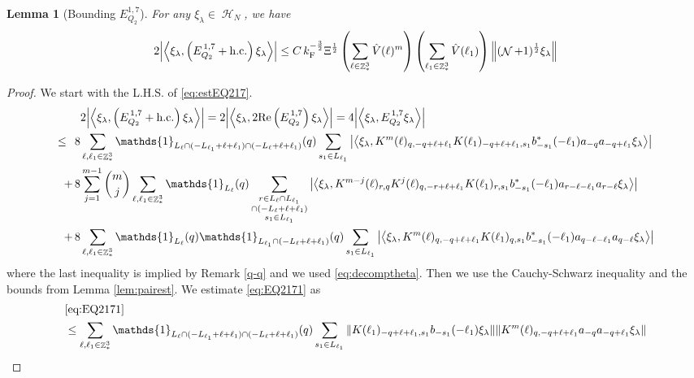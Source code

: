 \documentclass[12pt,a4paper]{article}
\numberwithin{equation}{section}
\newcommand{\1}{\mathbb{I}}
\newcommand{\F}{\mathrm{F}}
\DeclareMathOperator{\Z}{\mathbb{Z}}
\DeclareMathOperator{\HH}{\mathcal{H}}
\DeclareMathOperator{\NN}{\mathcal{N}}
\newcommand{\half}{\frac{1}{2}}
\newcommand{\eva}[1]{\left\langle #1 \right\rangle}
\theoremstyle{plain}
\newtheorem{lemma}[theorem]{Lemma}
\theoremstyle{definition}
\theoremstyle{remark}
\theoremstyle{plain}
\theoremstyle{definition}
\theoremstyle{remark}
\begin{document}
\begin{lemma}[Bounding $E_{Q_2}^{1,7}$]\label{lem:EQ217}
	For any $\xi_\lambda \in \HH_N$, we have
	\begin{align}
		2\abs{\eva{\xi_\lambda,\left(E^{\,1,7}_{Q_2}+\mathrm{h.c.}\right) \xi_\lambda }}
		\leq C\, k_{\F}^{-\frac{3}{2}} \Xi^{\half} \left(\sum\limits_{\ell\in \Z^3_*} \hat{V}(\ell)^m \right) \left(\sum\limits_{\ell_1\in \Z^3_*} \hat{V}(\ell_1) \right) \norm{(\NN+1)^\half \xi_\lambda } \label{eq:estEQ217}
	\end{align}
\end{lemma}
\begin{proof}
 We start with the L.H.S. of \eqref{eq:estEQ217}.
\begin{align}
	&2\abs{\eva{\xi_\lambda,\left(E^{\,1,7}_{Q_2}+\mathrm{h.c.}\right) \xi_\lambda }} =2 \abs{\eva{\xi_\lambda,2\mathrm{Re}\left(E^{\,1,7}_{Q_2}\right) \xi_\lambda }} = 4\abs{\eva{\xi_\lambda, E^{\,1,7}_{Q_2} \xi_\lambda }}\nonumber\\
	\leq\,\;8& \sum\limits_{\ell, \ell_1\in \Z^3_*} \mathds{1}_{L_{\ell} \cap (-L_{\ell_1}+\ell+\ell_1) \cap (-L_{\ell}+\ell+\ell_1)}(q) \sum\limits_{s_1 \in L_{\ell_1}} \abs{\eva{\xi_\lambda, K^m(\ell)_{q,-q+\ell+\ell_1} K(\ell_1)_{-q+\ell+\ell_1,s_1} b^*_{-s_1}(-\ell_1) a_{-q} a_{-q+\ell_1} \xi_\lambda}} \label{eq:EQ2171}\\
	+\,8& \sum\limits_{j=1}^{m-1} {{m}\choose j} \sum\limits_{\ell, \ell_1\in \Z^3_*}\mathds{1}_{L_{\ell}}(q) \sum\limits_{\substack{r\in L_{\ell} \cap L_{\ell_1} \\ \cap (-L_{\ell}+\ell+\ell_1)\\s_1\in L_{\ell_1}}}  \abs{\eva{\xi_\lambda, K^{m-j}(\ell)_{r,q} K^j(\ell)_{q,-r+\ell+\ell_1} K(\ell_1)_{r,s_1} b^*_{-s_1}(-\ell_1)a_{r-\ell-\ell_1}a_{r-\ell} \xi_\lambda }} \label{eq:EQ2172}\\
	+\,8&\sum\limits_{\ell, \ell_1\in \Z^3_*} \mathds{1}_{L_{\ell}}(q) \mathds{1}_{L_{\ell_1}\cap (-L_{\ell}+\ell+\ell_1)}(q) \sum\limits_{s_1\in L_{\ell_1}} \abs{\eva{\xi_\lambda, K^m(\ell)_{q,-q+\ell+\ell_1} K(\ell_1)_{q,s_1} b^*_{-s_1}(-\ell_1)a_{q-\ell-\ell_1}a_{q-\ell} \xi_\lambda }} \label{eq:EQ2173}
\end{align}
where the last inequality is implied by Remark \ref{q-q} and we used \eqref{eq:decomptheta}.
Then we use the Cauchy-Schwarz inequality and the bounds from Lemma \ref{lem:pairest}.
We estimate \eqref{eq:EQ2171} as 
\begin{align}
	&\eqref{eq:EQ2171}\nonumber\\
	&\leq \sum\limits_{\ell, \ell_1\in \Z^3_*} \mathds{1}_{L_{\ell} \cap (-L_{\ell_1}+\ell+\ell_1) \cap (-L_{\ell}+\ell+\ell_1)}(q) \sum\limits_{s_1 \in L_{\ell_1}} \norm{  K(\ell_1)_{-q+\ell+\ell_1,s_1} b_{-s_1}(-\ell_1) \xi_\lambda}\norm{ K^m(\ell)_{q,-q+\ell+\ell_1}a_{-q}a_{-q+\ell_1} \xi_\lambda }\nonumber\\

\end{align}
\end{proof}
\end{document}
